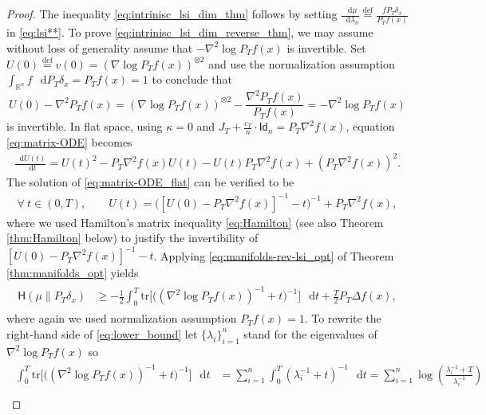 \documentclass[a4paper,twoside,11pt,reqno]{amsart}
\newcommand{\eqdef}{\stackrel{\mathrm{def}}{=}}
\newcommand*\diff{\mathop{}\!\mathrm{d}}
\newcommand{\R}{\mathbb{R}} %
\newcommand{\msf}{\mathsf}
\newcommand{\mr}{\mathrm}
\newcommand{\HH}{\mathsf{H}}
\begin{document}
\begin{proof}
The inequality \eqref{eq:intrinisc_lsi_dim_thm} follows by setting $\frac{\diff \mu}{\diff \lambda_n}\eqdef \frac{fP_T\delta_x}{P_Tf(x)}$ in \eqref{eq:lsi**}. To prove \eqref{eq:intrinisc_lsi_dim_reverse_thm}, we may assume without loss of generality assume that $-\nabla^2\log P_Tf(x)$ is invertible. Set $U(0)\eqdef v(0)=(\nabla\log P_Tf(x))^{\otimes 2}$ and use  the normalization assumption $\int_{\R^n} f\,\diff P_T\delta_x =P_Tf(x)=1$ to conclude that 
\begin{equation}
U(0)-\nabla^2P_Tf(x)  = (\nabla\log P_Tf(x))^{\otimes 2} - \frac{\nabla^2P_Tf(x)}{P_Tf(x)} = -\nabla^2\log P_Tf(x)
\end{equation}
is invertible. In flat space, using $\kappa=0$ and $J_T+\tfrac{c_T}{n}\cdot \msf{Id}_n= P_T\nabla^2 f(x)$, equation \eqref{eq:matrix-ODE} becomes
\begin{align} \label{eq:matrix-ODE_flat}
\frac{\diff U(t)}{\diff t} = U(t)^2-P_T\nabla^2 f(x)U(t)  - U(t) P_T\nabla^2 f(x) +  (P_T\nabla^2 f(x))^2.
\end{align}
The solution of \eqref{eq:matrix-ODE_flat} can be verified to be 
\begin{align} \label{eq:matrix-ODE_flat_sol}
\forall \ t\in(0,T), \qquad U(t)= \big([U(0)-P_T\nabla^2 f(x)]^{-1}-t \big)^{-1}+P_T\nabla^2 f(x),
\end{align}
where we used Hamilton's matrix inequality \eqref{eq:Hamilton} (see also Theorem \ref{thm:Hamilton} below) to justify the invertibility of  $[U(0)-P_T\nabla^2 f(x)]^{-1}-t$. Applying \eqref{eq:manifolds-rev-lsi_opt} of Theorem \ref{thm:manifolds_opt}  yields
\begin{align}\label{eq:lower_bound}
\begin{split}
\HH(\mu \| P_T\delta_x) &\geq -\frac{1}{2}\int_0^T \mr{tr}\big[\big((\nabla^2\log P_Tf(x))^{-1}+t \big)^{-1}\big]\,\diff t+\frac{T}{2}P_T\Delta f(x),
\end{split}
\end{align}
where again we used normalization assumption  $P_Tf(x)=1$. To rewrite the right-hand side of \eqref{eq:lower_bound} let $\{\lambda_i\}_{i=1}^n$ stand for the eigenvalues of $\nabla^2\log P_Tf(x)$ so
\begin{align}\label{eq:trace_term}
\begin{split}
\int_0^T \mr{tr}\big[\big((\nabla^2\log P_Tf(x))^{-1}+t \big)^{-1}\big]\,\diff t&=\sum_{i=1}^n\int_0^T (\lambda_i^{-1}+t)^{-1} \,\diff t=\sum_{i=1}^n\log \left(\frac{\lambda_i^{-1}+T}{\lambda_i^{-1}}\right) \\

\end{split}
\end{align}
\end{proof}
\end{document}
